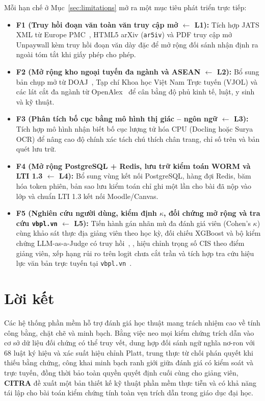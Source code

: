 Mỗi hạn chế ở Mục~\ref{sec:limitations} mở ra một mục tiêu phát triển trực tiếp:
{\setlength{\itemsep}{0pt}\setlength{\parskip}{0pt}
\begin{itemize}
    \item \textbf{F1 (Truy hồi đoạn văn toàn văn truy cập mở $\leftarrow$ L1):} Tích hợp JATS XML từ Europe PMC~\cite{europepmc}, HTML5 arXiv (\texttt{ar5iv}) và PDF truy cập mở Unpaywall kèm truy hồi đoạn văn dày đặc để mở rộng đối sánh nhận định ra ngoài tóm tắt khi giấy phép cho phép.
    \item \textbf{F2 (Mở rộng kho ngoại tuyến đa ngành và ASEAN $\leftarrow$ L2):} Bổ sung bản chụp mở từ DOAJ~\cite{doaj}, Tạp chí Khoa học Việt Nam Trực tuyến (VJOL) và các lát cắt đa ngành từ OpenAlex~\cite{openalex} để cân bằng độ phủ kinh tế, luật, y sinh và kỹ thuật.
    \item \textbf{F3 (Phân tích bố cục bằng mô hình thị giác -- ngôn ngữ $\leftarrow$ L3):} Tích hợp mô hình nhận biết bố cục lượng tử hóa CPU (Docling hoặc Surya OCR) để nâng cao độ chính xác tách chú thích chân trang, chỉ số trên và bản quét lưu trữ.
    \item \textbf{F4 (Mở rộng PostgreSQL + Redis, lưu trữ kiểm toán WORM và LTI 1.3 $\leftarrow$ L4):} Bổ sung vùng kết nối PostgreSQL, hàng đợi Redis, băm hóa token phiên, bản sao lưu kiểm toán chỉ ghi một lần cho bài đã nộp vào lớp và chuẩn LTI 1.3 kết nối Moodle/Canvas.
    \item \textbf{F5 (Nghiên cứu người dùng, kiểm định $\kappa$, đối chứng mở rộng và tra cứu \texttt{vbpl.vn} $\leftarrow$ L5):} Tiến hành gán nhãn mù đa đánh giá viên (Cohen's $\kappa$) cùng khảo sát thực địa giảng viên theo học kỳ, đối chiếu XGBoost và bộ kiểm chứng LLM-as-a-Judge có truy hồi~\cite{hu2024refchecker}, \cite{press2024citeme}, hiệu chỉnh trọng số CIS theo điểm giảng viên, xếp hạng rủi ro trên logit chưa cắt trần và tích hợp tra cứu hiệu lực văn bản trực tuyến tại \texttt{vbpl.vn}~\cite{vbpl-vn}.
\end{itemize}}

\section{Lời kết}

Các hệ thống phần mềm hỗ trợ đánh giá học thuật mang trách nhiệm cao về tính công bằng, chặt chẽ và minh bạch. Bằng việc neo mọi kiểm chứng trích dẫn vào cơ sở dữ liệu đối chứng có thể truy vết, dung hợp đối sánh ngữ nghĩa nơ-ron với 68 luật ký hiệu và xác suất hiệu chỉnh Platt, trung thực từ chối phán quyết khi thiếu bằng chứng, công khai minh bạch ranh giới giữa đánh giá có kiểm soát và trực tuyến, đồng thời bảo toàn quyền quyết định cuối cùng cho giảng viên, \textbf{CITRA} đề xuất một bản thiết kế kỹ thuật phần mềm thực tiễn và có khả năng tái lập cho bài toán kiểm chứng tính toàn vẹn trích dẫn trong giáo dục đại học.
